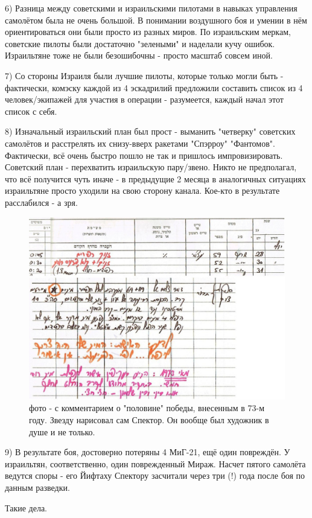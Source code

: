 6) Разница между советскими и израильскими пилотами в навыках управления самолётом была не очень большой. В понимании воздушного боя и умении в нём ориентироваться они были просто из разных миров. По израильским меркам, советские пилоты были достаточно "зелеными" и наделали кучу ошибок. Израильтяне тоже не были безошибочны - просто масштаб совсем иной.

7) Со стороны Израиля были лучшие пилоты, которые только могли быть - фактически, комэску каждой из 4 эскадрилий предложили составить список из 4 человек/экипажей для участия в операции - разумеется, каждый начал этот список с себя.

8) Изначальный израильский план был прост - выманить "четверку" советских самолётов и расстрелять их снизу-вверх ракетами "Спэрроу" "Фантомов". Фактически, всё очень быстро пошло не так и пришлось импровизировать.
Советский план - перехватить израильскую пару/звено. Никто не предполагал, что всё получится чуть иначе - в предыдущие 2 месяца в аналогичных ситуациях израильтяне просто уходили на свою сторону канала. Кое-кто в результате расслабился - а зря.


\begin{figure}[h!tb] 
	\centering\includegraphics[scale=0.4]{Dolina_0/nYQwdVjlzUE.jpg}
	\caption{фото - с комментарием о "половине" победы, внесенным в 73-м году. Звезду нарисовал сам Спектор. Он вообще был художник в душе и не только.}%
\end{figure}

9) В результате боя, достоверно потеряны 4 МиГ-21, ещё один повреждён. У израильтян, соответственно, один поврежденный Мираж. Насчет пятого самолёта ведутся споры - его Йифтаху Спектору засчитали через три (!) года после боя по данным разведки.




Такие дела.